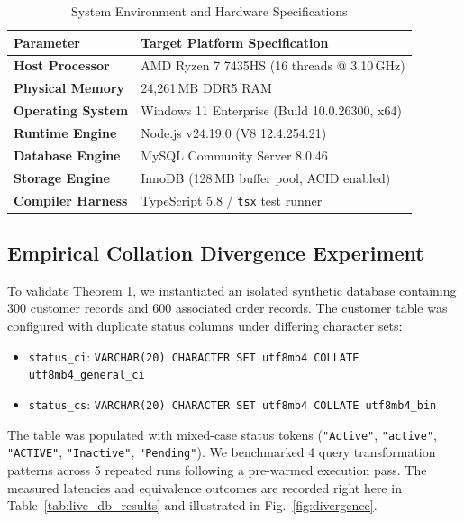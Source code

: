 \documentclass[conference]{IEEEtran}
\begin{document}
\begin{table}[t]
\caption{System Environment and Hardware Specifications}
\label{tab:hardware_specs}
\centering
\footnotesize
\renewcommand{\arraystretch}{1.12}
\begin{tabularx}{\columnwidth}{@{} >{\bfseries}p{2.5cm} X @{}}
\toprule
Parameter & Target Platform Specification \\
\midrule
Host Processor & AMD Ryzen 7 7435HS (16 threads @ 3.10\,GHz) \\
Physical Memory & 24,261\,MB DDR5 RAM \\
Operating System & Windows 11 Enterprise (Build 10.0.26300, x64) \\
Runtime Engine & Node.js v24.19.0 (V8 12.4.254.21) \\
Database Engine & MySQL Community Server 8.0.46 \\
Storage Engine & InnoDB (128\,MB buffer pool, ACID enabled) \\
Compiler Harness & TypeScript 5.8 / \texttt{tsx} test runner \\
\bottomrule
\end{tabularx}
\end{table}

\subsection{Empirical Collation Divergence Experiment}
To validate Theorem 1, we instantiated an isolated synthetic database containing 300 customer records and 600 associated order records. The customer table was configured with duplicate status columns under differing character sets:
\begin{itemize}
    \item \texttt{status\_ci}: \texttt{VARCHAR(20) CHARACTER SET utf8mb4 COLLATE utf8mb4\_general\_ci}
    \item \texttt{status\_cs}: \texttt{VARCHAR(20) CHARACTER SET utf8mb4 COLLATE utf8mb4\_bin}
\end{itemize}
The table was populated with mixed-case status tokens (\texttt{"Active"}, \texttt{"active"}, \texttt{"ACTIVE"}, \texttt{"Inactive"}, \texttt{"Pending"}). We benchmarked 4 query transformation patterns across 5 repeated runs following a pre-warmed execution pass. The measured latencies and equivalence outcomes are recorded right here in Table~\ref{tab:live_db_results} and illustrated in Fig.~\ref{fig:divergence}.
\end{document}
